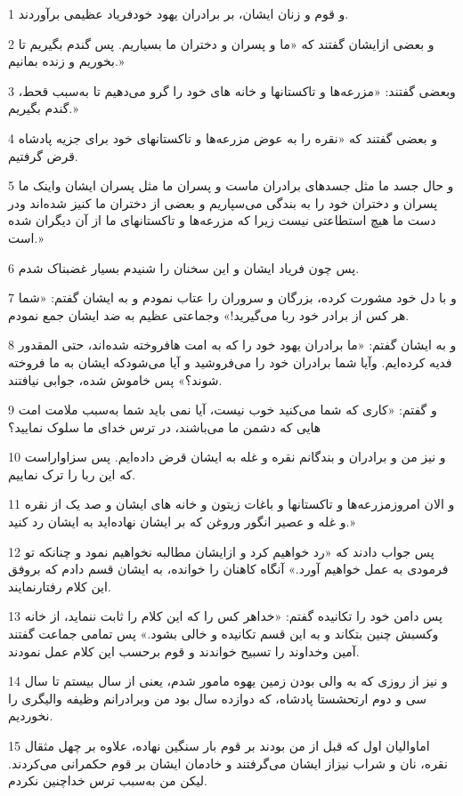 \par 1 و قوم و زنان ایشان، بر برادران یهود خودفریاد عظیمی برآوردند.
\par 2 و بعضی ازایشان گفتند که «ما و پسران و دختران ما بسیاریم. پس گندم بگیریم تا بخوریم و زنده بمانیم.»
\par 3 وبعضی گفتند: «مزرعه‌ها و تاکستانها و خانه های خود را گرو می‌دهیم تا به‌سبب قحط، گندم بگیریم.»
\par 4 و بعضی گفتند که «نقره را به عوض مزرعه‌ها و تاکستانهای خود برای جزیه پادشاه قرض گرفتیم.
\par 5 و حال جسد ما مثل جسدهای برادران ماست و پسران ما مثل پسران ایشان واینک ما پسران و دختران خود را به بندگی می‌سپاریم و بعضی از دختران ما کنیز شده‌اند ودر دست ما هیچ استطاعتی نیست زیرا که مزرعه‌ها و تاکستانهای ما از آن دیگران شده است.»
\par 6 پس چون فریاد ایشان و این سخنان را شنیدم بسیار غضبناک شدم.
\par 7 و با دل خود مشورت کرده، بزرگان و سروران را عتاب نمودم و به ایشان گفتم: «شما هر کس از برادر خود ربا می‌گیرید!» وجماعتی عظیم به ضد ایشان جمع نمودم.
\par 8 و به ایشان گفتم: «ما برادران یهود خود را که به امت هافروخته شده‌اند، حتی المقدور فدیه کرده‌ایم. وآیا شما برادران خود را می‌فروشید و آیا می‌شودکه ایشان به ما فروخته شوند؟» پس خاموش شده، جوابی نیافتند.
\par 9 و گفتم: «کاری که شما می‌کنید خوب نیست، آیا نمی باید شما به‌سبب ملامت امت هایی که دشمن ما می‌باشند، در ترس خدای ما سلوک نمایید؟
\par 10 و نیز من و برادران و بندگانم نقره و غله به ایشان قرض داده‌ایم. پس سزاواراست که این ربا را ترک نماییم.
\par 11 و الان امروزمزرعه‌ها و تاکستانها و باغات زیتون و خانه های ایشان و صد یک از نقره و غله و عصیر انگور وروغن که بر ایشان نهاده‌اید به ایشان رد کنید.»
\par 12 پس جواب دادند که «رد خواهیم کرد و ازایشان مطالبه نخواهیم نمود و چنانکه تو فرمودی به عمل خواهیم آورد.» آنگاه کاهنان را خوانده، به ایشان قسم دادم که بروفق این کلام رفتارنمایند.
\par 13 پس دامن خود را تکانیده گفتم: «خداهر کس را که این کلام را ثابت ننماید، از خانه وکسبش چنین بتکاند و به این قسم تکانیده و خالی بشود.» پس تمامی جماعت گفتند آمین وخداوند را تسبیح خواندند و قوم برحسب این کلام عمل نمودند.
\par 14 و نیز از روزی که به والی بودن زمین یهوه مامور شدم، یعنی از سال بیستم تا سال سی و دوم ارتحشستا پادشاه، که دوازده سال بود من وبرادرانم وظیفه والیگری را نخوردیم.
\par 15 اماوالیان اول که قبل از من بودند بر قوم بار سنگین نهاده، علاوه بر چهل مثقال نقره، نان و شراب نیزاز ایشان می‌گرفتند و خادمان ایشان بر قوم حکمرانی می‌کردند. لیکن من به‌سبب ترس خداچنین نکردم.
